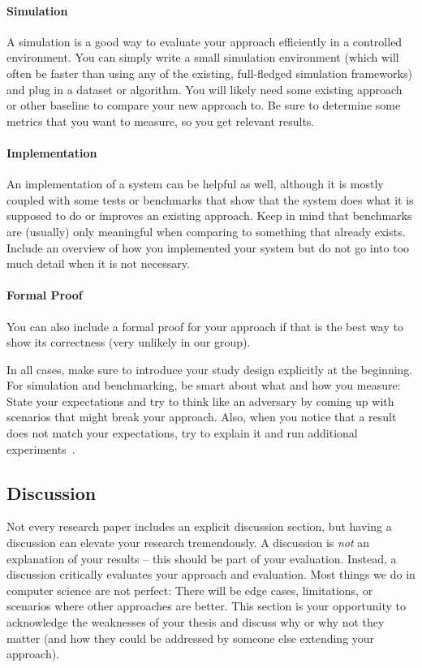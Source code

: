 \documentclass[a4paper]{article}
\begin{document}
\paragraph{Simulation}
A simulation is a good way to evaluate your approach efficiently in a controlled environment.
You can simply write a small simulation environment (which will often be faster than using any of the existing, full-fledged simulation frameworks) and plug in a dataset or algorithm.
You will likely need some existing approach or other baseline to compare your new approach to.
Be sure to determine some metrics that you want to measure, so you get relevant results.

\paragraph{Implementation}
An implementation of a system can be helpful as well, although it is mostly coupled with some tests or benchmarks that show that the system does what it is supposed to do or improves an existing approach.
Keep in mind that benchmarks are (usually) only meaningful when comparing to something that already exists.
Include an overview of how you implemented your system but do not go into too much detail when it is not necessary.

\paragraph{Formal Proof}
You can also include a formal proof for your approach if that is the best way to show its correctness (very unlikely in our group).

In all cases, make sure to introduce your study design explicitly at the beginning.
For simulation and benchmarking, be smart about what and how you measure:
State your expectations and try to think like an adversary by coming up with scenarios that might break your approach.
Also, when you notice that a result does not match your expectations, try to explain it and run additional experiments~\cite{mhandley-twitter}.

\subsection{Discussion}
Not every research paper includes an explicit discussion section, but having a discussion can elevate your research tremendously.
A discussion is \emph{not} an explanation of your results -- this should be part of your evaluation.
Instead, a discussion critically evaluates your approach and evaluation.
Most things we do in computer science are not perfect:
There will be edge cases, limitations, or scenarios where other approaches are better.
This section is your opportunity to acknowledge the weaknesses of your thesis and discuss why or why not they matter (and how they could be addressed by someone else extending your approach).
\end{document}
